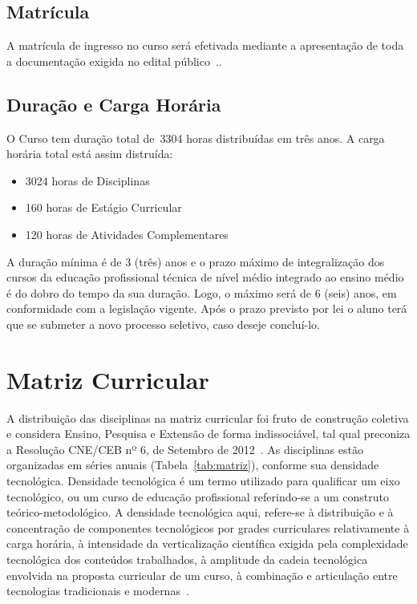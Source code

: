 \documentclass[11pt,fleqn]{book} %
\newcommand{\VER}[1]{\begingroup\color{red}#1\endgroup}
\begin{document}
\subsection{Matrícula}

A matrícula de ingresso no curso será efetivada mediante a apresentação de toda a documentação exigida no edital público~\cite{Resolucao22De2011}..

\subsection{Duração e Carga Horária}
\indent

O Curso tem duração total de~\VER{3304} horas distribuídas em três anos.
A carga horária total está assim distruída:
\begin{itemize}
	\item \VER{3024} horas de Disciplinas
	\item \VER{160} horas de Estágio Curricular
	\item \VER{120} horas de Atividades Complementares
\end{itemize}

A duração mínima é de 3 (três) anos e o prazo máximo de integralização dos cursos da educação profissional técnica de nível médio integrado ao ensino médio é do dobro do tempo da sua duração. 
Logo, o máximo será de 6 (seis) anos, em conformidade com a legislação vigente. 
Após o prazo previsto por lei o aluno terá que se submeter a novo processo seletivo, caso deseje concluí-lo.


\section{Matriz Curricular}\label{matriz}
\indent
%
%

A distribuição das disciplinas na matriz curricular foi fruto de construção coletiva e considera Ensino, Pesquisa e Extensão de forma indissociável, tal qual preconiza  a Resolução CNE/CEB nº 6, de Setembro de 2012~\cite{Resolucao06De2012}.
As disciplinas estão organizadas em séries anuais (Tabela~\ref{tab:matriz}), conforme sua densidade tecnológica.
Densidade tecnológica é um termo utilizado para qualificar um eixo tecnológico, ou um curso de educação profissional referindo-se a um construto teórico-metodológico. 
A densidade tecnológica aqui, refere-se à distribuição e à concentração de componentes tecnológicos por grades curriculares relativamente à carga horária, à intensidade da verticalização científica exigida pela complexidade tecnológica dos conteúdos trabalhados, à amplitude da cadeia tecnológica envolvida na proposta curricular de um curso, à combinação e articulação entre tecnologias tradicionais e modernas~\cite{Machado2010}.
\end{document}
